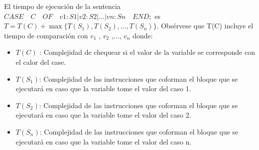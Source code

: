 El tiempo de ejecución de la sentencia $CASE\quad C \quad OF\quad v1:S1|v2:S2|...|vn:Sn\quad
END;$ es $T = T(C) + \max\{T(S_1 ),T(S_2 ),...,T(S_n)\}$. Obsérvese que T(C) incluye el
tiempo de comparación con $v_1$ , $v_2$ ,..., $v_n$ donde:

\begin{itemize}
	\item $T(C)$ : Complejidad de chequear si el valor de la variable se corresponde con el calor del case.
	\item $T(S_1)$: Complejidad de las instrucciones que coforman el bloque que se ejecutará en caso que la variable tome el valor del caso 1. 
	\item $T(S_2)$: Complejidad de las instrucciones que coforman el bloque que se ejecutará en caso que la variable tome el valor del caso 2. 
	\item $T(S_n)$: Complejidad de las instrucciones que coforman el bloque que se ejecutará en caso que la variable tome el valor del caso n. 
\end{itemize}
